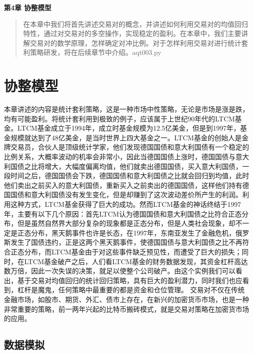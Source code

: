 \documentclass{article}
\begin{document}
\maketitle\begin{center}
\Large \textbf{第4章 协整模型}
\end{center}
\begin{abstract}
在本章中我们将首先讲述交易对的概念，并讲述如何利用交易对的均值回归特性，通过对交易对的多空操作，实现稳定的盈利。在本章中，我们主要讲解交易对的数学原理，怎样确定对冲比例。对于怎样利用交易对进行统计套利策略研发，将在后续章节中介绍。aqt003.py
\end{abstract}
\section{协整模型}
本章讲述的内容是统计套利策略，这是一种市场中性策略，无论是市场是涨是跌，均有可能盈利。将统计套利用到极致的例子，应该属于上世纪90年代的LTCM基金。LTCM基金成立于1994年，成立时基金规模为12.5亿美金，但是到1997年，基金规模就达到了48亿美金，是当时世界上四大基金之一。LTCM基金的创始人是金牌交易员，合伙人是顶级统计学家，他们发现德国国债和意大利国债有一个稳定的比例关系，大概率波动的机率会非常小，因此当德国国债上涨时，德国国债与意大利国债之比将增大，大幅度偏离均值，他们就卖出德国国债，买入意大利国债，一段时间之后，德国国债会下跌，德国国债和意大利国债之比就会回归到均值，此时他们卖出之前买入的意大利国债，重新买入之前卖出的德国国债，这样他们持有德国国债和意大利国债没有发生变化，但是却赚到了这次波动差价所产生的利润。利用这种方式，LTCM基金获得了巨大的成功。然而LTCM基金的神话终结于1997年，主要有以下几个原因：首先LTCM认为德国国债和意大利国债之比符合正态分布，但是虽然自然界大部分复杂的现象都是正态分布，但是人类社会现象，却不一定是正态分布，黑天鹅事件也许是长态，在1997年，东南亚发生了金融危机，俄罗斯发生了国债违约，正是这两个黑天鹅事件，使德国国债与意大利国债之比不再符合正态分布，而LTCM基金由于对这些事件缺乏预见性，而遭受了巨大的损失；同时，在LTCM基金破产之后，人们看LTCM基金的财务数据发现，其资金杠杆高达数万倍，因此一次失误的决策，就足以使整个公司破产。由这个实例我们可以看出，基于交易对均值回归的统计回归策略，具有巨大的盈利潜力，同时我们也应看到，杠杆是魔鬼，任何策略中最重要的都是资金和仓位管理。\newline
交易对不仅在传统金融市场，如股市、期货、外汇、债市上存在，在新兴的加密货币市场，也是一种非常重要的策略，前一两年兴起的比特币搬砖模式，就是交易对策略在加密货市场的应用。
\subsection{数据模拟}
\end{document}
